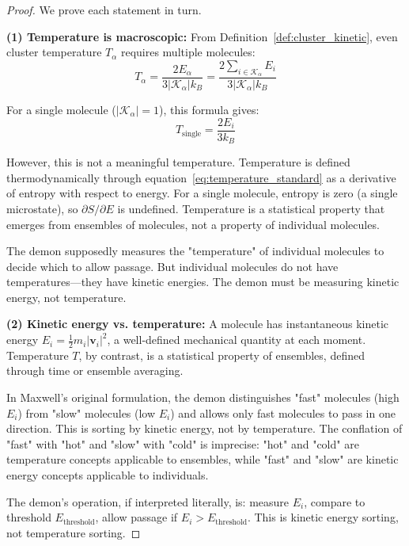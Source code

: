 \documentclass[12pt,a4paper]{article}
\theoremstyle{definition}
\theoremstyle{remark}
\begin{document}
\begin{proof}
We prove each statement in turn.

\textbf{(1) Temperature is macroscopic:}
From Definition~\ref{def:cluster_kinetic}, even cluster temperature $T_\alpha$ requires multiple molecules:
\begin{equation}
T_\alpha = \frac{2 E_\alpha}{3 |\mathcal{K}_\alpha| k_B} = \frac{2 \sum_{i \in \mathcal{K}_\alpha} E_i}{3 |\mathcal{K}_\alpha| k_B}
\end{equation}

For a single molecule ($|\mathcal{K}_\alpha| = 1$), this formula gives:
\begin{equation}
T_{\text{single}} = \frac{2 E_i}{3 k_B}
\end{equation}

However, this is not a meaningful temperature. Temperature is defined thermodynamically through equation~\eqref{eq:temperature_standard} as a derivative of entropy with respect to energy. For a single molecule, entropy is zero (a single microstate), so $\partial S / \partial E$ is undefined. Temperature is a statistical property that emerges from ensembles of molecules, not a property of individual molecules.

The demon supposedly measures the "temperature" of individual molecules to decide which to allow passage. But individual molecules do not have temperatures—they have kinetic energies. The demon must be measuring kinetic energy, not temperature.

\textbf{(2) Kinetic energy vs. temperature:}
A molecule has instantaneous kinetic energy $E_i = \frac{1}{2} m_i |\mathbf{v}_i|^2$, a well-defined mechanical quantity at each moment. Temperature $T$, by contrast, is a statistical property of ensembles, defined through time or ensemble averaging.

In Maxwell's original formulation, the demon distinguishes "fast" molecules (high $E_i$) from "slow" molecules (low $E_i$) and allows only fast molecules to pass in one direction. This is sorting by kinetic energy, not by temperature. The conflation of "fast" with "hot" and "slow" with "cold" is imprecise: "hot" and "cold" are temperature concepts applicable to ensembles, while "fast" and "slow" are kinetic energy concepts applicable to individuals.

The demon's operation, if interpreted literally, is: measure $E_i$, compare to threshold $E_{\text{threshold}}$, allow passage if $E_i > E_{\text{threshold}}$. This is kinetic energy sorting, not temperature sorting.


\end{proof}
\end{document}

